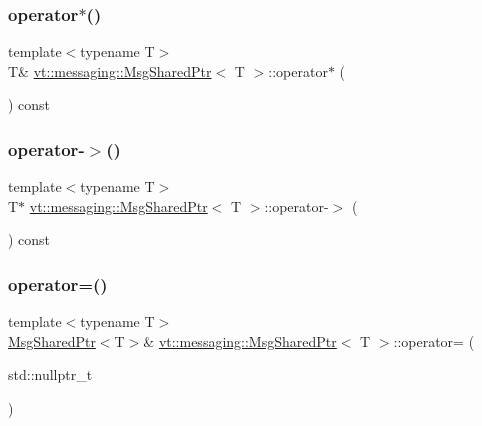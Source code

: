 \subsubsection{\texorpdfstring{operator$\ast$()}{operator*()}}
{\footnotesize\ttfamily template$<$typename T$>$ \\
T\& \hyperlink{structvt_1_1messaging_1_1_msg_shared_ptr}{vt\+::messaging\+::\+Msg\+Shared\+Ptr}$<$ T $>$\+::operator$\ast$ (\begin{DoxyParamCaption}{ }\end{DoxyParamCaption}) const\hspace{0.3cm}{\ttfamily [inline]}}

\mbox{\label{structvt_1_1messaging_1_1_msg_shared_ptr_a4140dc4ea157de37d258c8f8821179c8}} 
\subsubsection{\texorpdfstring{operator-\/$>$()}{operator->()}}
{\footnotesize\ttfamily template$<$typename T$>$ \\
T$\ast$ \hyperlink{structvt_1_1messaging_1_1_msg_shared_ptr}{vt\+::messaging\+::\+Msg\+Shared\+Ptr}$<$ T $>$\+::operator-\/$>$ (\begin{DoxyParamCaption}{ }\end{DoxyParamCaption}) const\hspace{0.3cm}{\ttfamily [inline]}}

\mbox{\label{structvt_1_1messaging_1_1_msg_shared_ptr_ac6f496608ceb2f96b9457b0082f76e28}} 
\subsubsection{\texorpdfstring{operator=()}{operator=()}\hspace{0.1cm}{\footnotesize\ttfamily [1/3]}}
{\footnotesize\ttfamily template$<$typename T$>$ \\
\hyperlink{structvt_1_1messaging_1_1_msg_shared_ptr}{Msg\+Shared\+Ptr}$<$T$>$\& \hyperlink{structvt_1_1messaging_1_1_msg_shared_ptr}{vt\+::messaging\+::\+Msg\+Shared\+Ptr}$<$ T $>$\+::operator= (\begin{DoxyParamCaption}\item[{std\+::nullptr\+\_\+t}]{ }\end{DoxyParamCaption})\hspace{0.3cm}{\ttfamily [inline]}}

